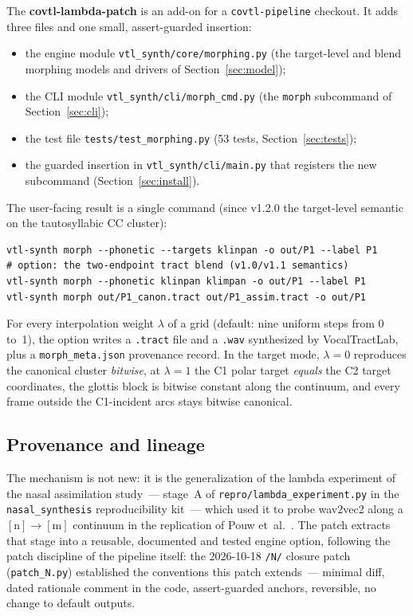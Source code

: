 \documentclass[11pt,a4paper]{article}
\newcommand{\lam}{\lambda}
\newcommand{\code}[1]{\texttt{#1}}
\newcommand{\sectref}[1]{Section~\ref{#1}}
\begin{document}
The \textbf{covtl-lambda-patch} is an add-on for a
\code{covtl-pipeline} checkout.  It adds three files and one small,
assert-guarded insertion:

\begin{itemize}[leftmargin=1.6em, itemsep=1pt]
\item the engine module \code{vtl\_synth/core/morphing.py} (the
target-level and blend morphing models and drivers of
\sectref{sec:model});
\item the CLI module \code{vtl\_synth/cli/morph\_cmd.py} (the
\code{morph} subcommand of \sectref{sec:cli});
\item the test file \code{tests/test\_morphing.py} (53 tests,
\sectref{sec:tests});
\item the guarded insertion in \code{vtl\_synth/cli/main.py} that
registers the new subcommand (\sectref{sec:install}).
\end{itemize}

The user-facing result is a single command (since v1.2.0 the
target-level semantic on the tautosyllabic CC cluster):

\begin{lstlisting}[style=shell]
vtl-synth morph --phonetic --targets klinpan -o out/P1 --label P1
# option: the two-endpoint tract blend (v1.0/v1.1 semantics)
vtl-synth morph --phonetic klinpan klimpan -o out/P1 --label P1
vtl-synth morph out/P1_canon.tract out/P1_assim.tract -o out/P1
\end{lstlisting}

For every interpolation weight $\lam$ of a grid (default: nine
uniform steps from 0 to~1), the option writes a \code{.tract} file
and a \code{.wav} synthesized by VocalTractLab, plus a
\code{morph\_meta.json} provenance record.  In the target mode,
$\lam=0$ reproduces the canonical cluster \emph{bitwise}, at $\lam=1$
the C1 polar target \emph{equals} the C2 target coordinates, the
glottis block is bitwise constant along the continuum, and every
frame outside the C1-incident arcs stays bitwise canonical.

\subsection{Provenance and lineage}

The mechanism is not new: it is the generalization of the lambda
experiment of the nasal assimilation study~--- stage~A of
\code{repro/lambda\_experiment.py} in the \code{nasal\_synthesis}
reproducibility kit~--- which used it to probe wav2vec2 along a
$[\text{n}]\!\to\![\text{m}]$ continuum in the replication of
Pouw et~al.~\citep{pouw2024}.  The patch extracts that stage into a
reusable, documented and tested engine option, following the patch
discipline of the pipeline itself: the 2026-10-18 \code{/N/}
closure patch (\code{patch\_N.py}) established the conventions this
patch extends~--- minimal diff, dated rationale comment in the
code, assert-guarded anchors, reversible, no change to default
outputs.
\end{document}
